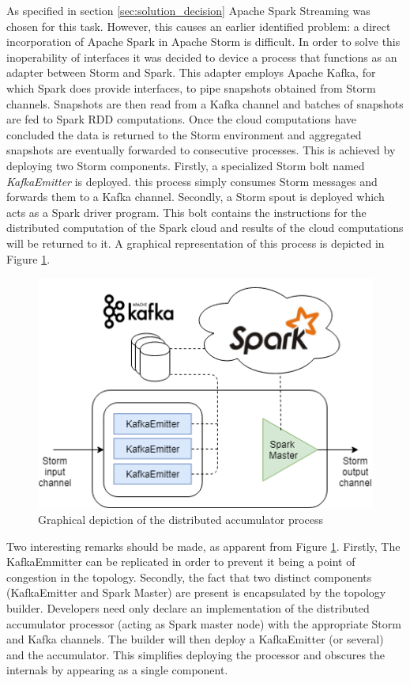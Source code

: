 As specified in section \ref{sec:solution_decision} Apache Spark Streaming was chosen for this task. However, this causes an earlier identified problem: a direct incorporation of Apache Spark in Apache Storm is difficult. In order to solve this inoperability of interfaces it was decided to device a process that functions as an adapter between Storm and Spark. This adapter employs Apache Kafka, for which Spark does provide interfaces, to pipe snapshots obtained from Storm channels. Snapshots are then read from a Kafka channel and batches of snapshots are fed to Spark RDD computations. Once the cloud computations have concluded the data is returned to the Storm environment and aggregated snapshots are eventually forwarded to consecutive processes. This is achieved by deploying two Storm components. Firstly, a specialized Storm bolt named \emph{KafkaEmitter} is deployed. this process simply consumes Storm messages and forwards them to a Kafka channel. Secondly, a Storm spout is deployed which acts as a Spark driver program. This bolt contains the instructions for the distributed computation of the Spark cloud and results of the cloud computations will be returned to it. A graphical representation of this process is depicted in Figure \ref{fig:distributed_accumulator}.

\begin{figure}
\centering
\includegraphics[width=.7\textwidth]{resources/img/distributed_accumulator.png}
\caption{Graphical depiction of the distributed accumulator process}
\label{fig:distributed_accumulator}
\end{figure}

Two interesting remarks should be made, as apparent from Figure \ref{fig:distributed_accumulator}. Firstly, The KafkaEmmitter can be replicated in order to prevent it being a point of congestion in the topology. Secondly, the fact that two distinct components (KafkaEmitter and Spark Master) are present is encapsulated by the topology builder. Developers need only declare an implementation of the distributed accumulator processor (acting as Spark master node) with the appropriate Storm and Kafka channels. The builder will then deploy a KafkaEmitter (or several) and the accumulator. This simplifies deploying the processor and obscures the internals by appearing as a single component.

